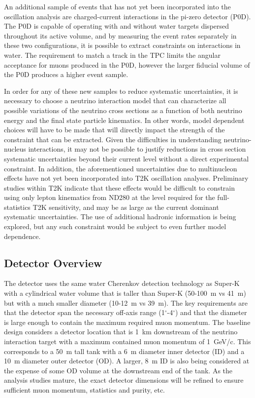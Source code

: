 An additional sample of events that has not yet been incorporated into the oscillation analysis are charged-current interactions in the pi-zero detector (P0D). The P0D is capable of operating with and without water targets dispersed throughout its active volume, and by measuring the event rates separately in these two configurations, it is possible to extract constraints on interactions in water. The requirement to match a track in the TPC limits the angular acceptance for muons produced in the P0D, however the larger fiducial volume of the P0D produces a higher event sample.

In order for any of these new samples to reduce systematic uncertainties, it is necessary to choose a neutrino interaction model that can characterize all possible variations of the neutrino cross sections as a function of both neutrino energy and the final state particle kinematics. In other words, model dependent choices will have to be made that will directly impact the strength of the constraint that can be extracted. Given the difficulties in understanding neutrino-nucleus interactions, it may not be possible to justify reductions in cross section systematic uncertainties beyond their current level without a direct experimental constraint. In addition, the aforementioned uncertainties due to multinucleon effects have not yet been incorporated into T2K oscillation analyses. Preliminary studies within T2K indicate that these effects would be difficult to constrain using only lepton kinematics from ND280 at the level required for the full-statistics T2K sensitivity, and may be as large as the current dominant systematic uncertainties. The use of additional hadronic information is being explored, but any such constraint would be subject to even further model dependence.

\subsection{Detector Overview}

The \nuprismlite detector uses the same water Cherenkov detection technology as Super-K with a cylindrical water volume that is taller than Super-K (50-100~m vs 41~m) but with a much smaller diameter (10-12~m vs 39~m). The key requirements are that the detector span the necessary off-axis range (1$^\circ$-4$^\circ$) and that the diameter is large enough to contain the maximum required muon momentum. The baseline design considers a detector location that is 1~km downstream of the neutrino interaction target with a maximum contained muon momentum of 1~GeV/c. This corresponds to a 50~m tall tank with a 6~m diameter inner detector (ID) and a 10~m diameter outer detector (OD). A larger, 8~m ID is also being considered at the expense of some OD volume at the downstream end of the tank. As the \nuprismlite analysis studies mature, the exact detector dimensions will be refined to ensure sufficient muon momentum, \nue statistics and purity, etc.


